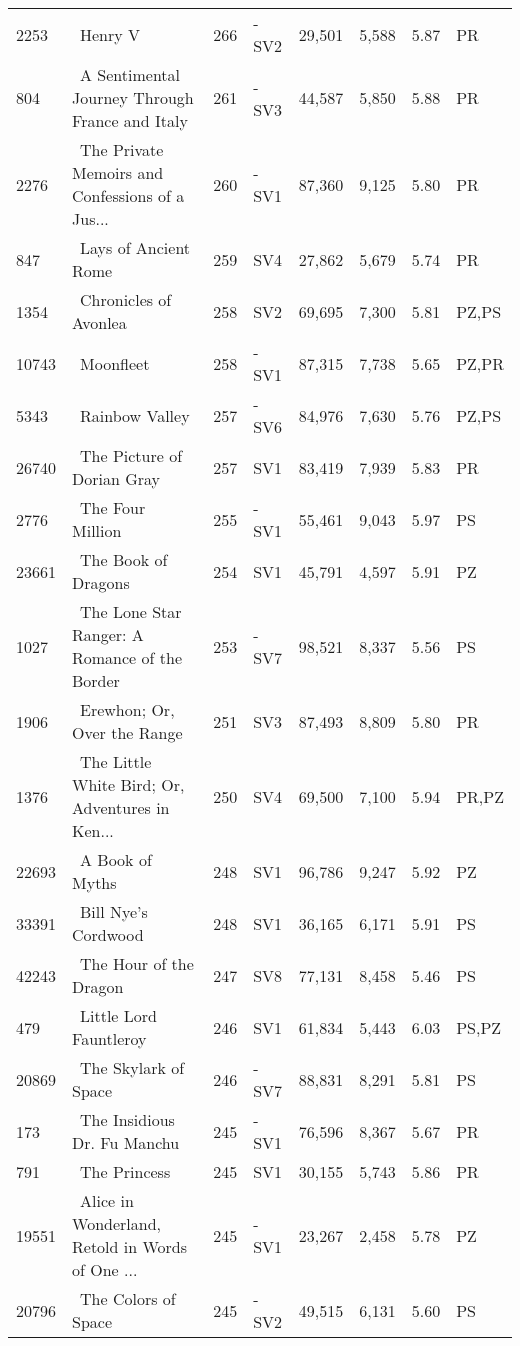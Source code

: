 \begin{longtable}{l | l | l | l | l | l | l | l}
2253 & ~Henry V & 266 & -SV2 & 29,501 & 5,588 & 5.87 & PR\\
804 & ~A Sentimental Journey Through France and Italy & 261 & -SV3 & 44,587 & 5,850 & 5.88 & PR\\
2276 & ~The Private Memoirs and Confessions of a Jus... & 260 & -SV1 & 87,360 & 9,125 & 5.80 & PR\\
847 & ~Lays of Ancient Rome & 259 & SV4 & 27,862 & 5,679 & 5.74 & PR\\
1354 & ~Chronicles of Avonlea & 258 & SV2 & 69,695 & 7,300 & 5.81 & PZ,PS\\
10743 & ~Moonfleet & 258 & -SV1 & 87,315 & 7,738 & 5.65 & PZ,PR\\
5343 & ~Rainbow Valley & 257 & -SV6 & 84,976 & 7,630 & 5.76 & PZ,PS\\
26740 & ~The Picture of Dorian Gray & 257 & SV1 & 83,419 & 7,939 & 5.83 & PR\\
2776 & ~The Four Million & 255 & -SV1 & 55,461 & 9,043 & 5.97 & PS\\
23661 & ~The Book of Dragons & 254 & SV1 & 45,791 & 4,597 & 5.91 & PZ\\
1027 & ~The Lone Star Ranger: A Romance of the Border & 253 & -SV7 & 98,521 & 8,337 & 5.56 & PS\\
1906 & ~Erewhon; Or, Over the Range & 251 & SV3 & 87,493 & 8,809 & 5.80 & PR\\
1376 & ~The Little White Bird; Or, Adventures in Ken... & 250 & SV4 & 69,500 & 7,100 & 5.94 & PR,PZ\\
22693 & ~A Book of Myths & 248 & SV1 & 96,786 & 9,247 & 5.92 & PZ\\
33391 & ~Bill Nye's Cordwood & 248 & SV1 & 36,165 & 6,171 & 5.91 & PS\\
42243 & ~The Hour of the Dragon & 247 & SV8 & 77,131 & 8,458 & 5.46 & PS\\
479 & ~Little Lord Fauntleroy & 246 & SV1 & 61,834 & 5,443 & 6.03 & PS,PZ\\
20869 & ~The Skylark of Space & 246 & -SV7 & 88,831 & 8,291 & 5.81 & PS\\
173 & ~The Insidious Dr. Fu Manchu & 245 & -SV1 & 76,596 & 8,367 & 5.67 & PR\\
791 & ~The Princess & 245 & SV1 & 30,155 & 5,743 & 5.86 & PR\\
19551 & ~Alice in Wonderland, Retold in Words of One ... & 245 & -SV1 & 23,267 & 2,458 & 5.78 & PZ\\
20796 & ~The Colors of Space & 245 & -SV2 & 49,515 & 6,131 & 5.60 & PS\\

\end{longtable}
